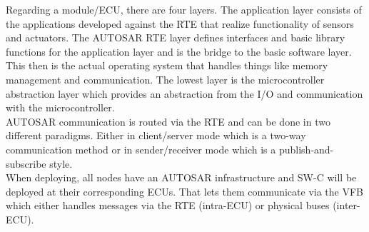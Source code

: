Regarding a module/ECU, there are four layers.
The application layer consists of the applications developed against the RTE that realize functionality of sensors and actuators.
The AUTOSAR RTE layer defines interfaces and basic library functions for the application layer and is the bridge to the basic software layer.
This then is the actual operating system that handles things like memory management and communication.
The lowest layer is the microcontroller abstraction layer which provides an abstraction from the I/O and communication with the microcontroller.\\

AUTOSAR communication is routed via the RTE and can be done in two different paradigms.
Either in client/server mode which is a two-way communication method or in sender/receiver mode which is a publish-and-subscribe style.\\

When deploying, all nodes have an AUTOSAR infrastructure and SW-C will be deployed at their corresponding ECUs.
That lets them communicate via the VFB which either handles messages via the RTE (intra-ECU) or physical buses (inter-ECU).

